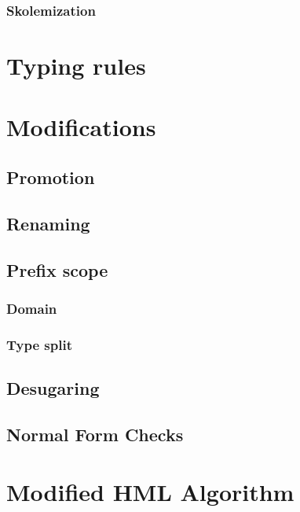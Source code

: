 \subsubsection{Skolemization}
\section{Typing rules}
\section{Modifications}
\subsection{Promotion}
\subsection{Renaming}
\subsection{Prefix scope}
\subsubsection{Domain}
\subsubsection{Type split}
\subsection{Desugaring}
\subsection{Normal Form Checks}
\section{Modified HML Algorithm}
